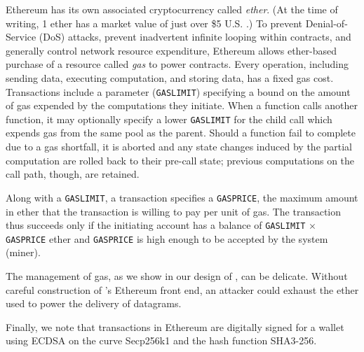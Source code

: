 Ethereum has its own associated cryptocurrency called \emph{ether}. (At the time of writing, 1 ether has a market value of just over \$5 U.S. \cite{ethprice}.)
To prevent Denial-of-Service (DoS) attacks, prevent inadvertent infinite looping within contracts, and generally control network resource expenditure,
Ethereum allows ether-based purchase of a resource called \emph{gas} to power contracts.
Every operation, including sending data, executing computation, and storing data, has a fixed gas cost.
Transactions include a parameter (\texttt{GASLIMIT}) specifying a bound on the amount of gas expended by the computations they initiate.
When a function calls another function, it may optionally specify a lower \texttt{GASLIMIT} for the child call which expends gas from the same pool as the parent.
Should a function fail to complete due to a gas shortfall,
it is aborted and any state changes induced by the partial computation are rolled back to their pre-call state;
previous computations on the call path, though, are retained.

Along with a \texttt{GASLIMIT}, a transaction specifies a \texttt{GASPRICE}, the maximum amount in ether that the transaction is willing to pay per unit of gas. The transaction thus succeeds only if the initiating account has a balance of \texttt{GASLIMIT} $\times$ \texttt{GASPRICE} ether and \texttt{GASPRICE} is high enough to be accepted by the system (miner). 

The management of gas, as we show in our design of \tcs, can be delicate.
Without careful construction of \tc's Ethereum front end, an attacker could exhaust the ether used to power the delivery of datagrams.

Finally, we note that transactions in Ethereum are digitally signed for a wallet using ECDSA on the curve Secp256k1 and the hash function SHA3-256.



